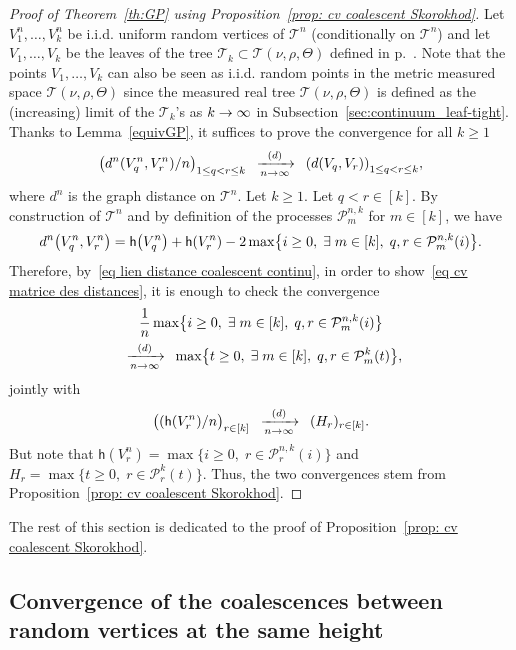 \documentclass[AHL,Unicode,published]{cedram}
\newcommand{\cvloi}[1][n]{\enskip\xrightarrow[#1 \to \infty]{(d)}\enskip}
\newcommand{\1}{\mathbbm{1}}
\newcommand{\Part}{\mathcal{P}}
\newcommand{\T}{\mathcal{T}}
\newcommand{\h}{\mathsf{h}}
\let\originalleft\left
\let\originalright\right
\renewcommand{\left}{\mathopen{}\mathclose\bgroup\originalleft}
\renewcommand{\right}{\aftergroup\egroup\originalright}
\renewcommand*{\to}{\mathchoice{\longrightarrow}{\rightarrow}{\rightarrow}{\rightarrow}}
\let\oldexists\exists
\renewcommand*{\exists}{\mathrel{\oldexists}}
\begin{document}
\begin{proof}[Proof of Theorem~\ref{th:GP} using Proposition~\ref{prop: cv coalescent Skorokhod}]
Let $V^n_1, \dots, V^n_k$ be i.i.d. uniform random vertices of $\T^n$ (conditionally on $\T^n$) and let $V_1, \dots, V_k$ be the leaves of the tree $\T_k\subset \T(\nu, \rho,\Theta)$ defined in p.~\pageref{th:GHP}. Note that the points $V_1,\dots, V_k$ can also be seen as i.i.d. random points in the metric measured space $\T(\nu, \rho,\Theta)$ since the measured real tree $\T(\nu, \rho,\Theta)$ is defined as the (increasing) limit of the $\T_k$'s as $k\to \infty$ in Subsection~\ref{sec:continuum_leaf-tight}. Thanks to Lemma~\ref{equivGP}, it suffices to prove the convergence for all $k\ge 1$
\begin{equation}\label{eq cv matrice des distances}
\left(d^n(V^n_q,V^n_r)/n \right)_{1 \le q < r \le k}
\cvloi[n]
\left(d(V_q,V_r) \right)_{1 \le q < r \le k},
\end{equation}
where $d^n$ is the graph distance on $\T^n$. Let $k\ge 1$. Let $q<r \in [k]$. By construction of $\T^n$ and by definition of the processes $\Part^{n,k}_m$ for $m \in [k]$, we have
\[
{d}^n\left(V^n_q,V^n_r\right) = \h\left(V^n_q\right) +\h\left(V^n_r\right)-2 \max \left\{i \ge 0, \; \exists m \in [k], \; q,r \in \Part^{n,k}_m(i) \right\}.
\]
Therefore, by~\eqref{eq lien distance coalescent continu}, in order to show~\eqref{eq cv matrice des distances}, it is enough to check the convergence
\begin{multline*}
\frac{1}{n}\max \left\{i \ge 0, \; \exists m \in [k], \; q,r \in \Part^{n,k}_m(i) \right\}\\
\cvloi[n]
\max \left\{ t \ge 0, \; \exists m \in [k], \; q, r \in \Part_m^k(t) \right\},
\end{multline*}
jointly with
\begin{equation}\label{eq cv hauteurs unif}
\bigl((\h(V^n_r)/n\bigr)_{r \in [k]} \cvloi[n] (H_r)_{r \in [k]}.
\end{equation}
But note that $\h(V^n_r) = \max \{ i\ge 0, \; r \in \Part_r^{n,k}(i) \}$ and $H_r = \max\{t \ge 0, \; r \in \Part^k_r(t)\}$. Thus, the two convergences stem from Proposition~\ref{prop: cv coalescent Skorokhod}.
\end{proof}

The rest of this section is dedicated to the proof of Proposition~\ref{prop: cv coalescent Skorokhod}.

\subsection{Convergence of the coalescences between random vertices at the same height}
\end{document}

